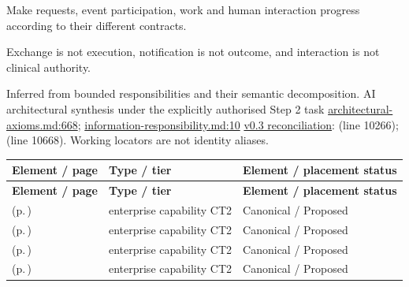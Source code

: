 
Make requests, event participation, work and human interaction progress according to their different contracts.



Exchange is not execution, notification is not outcome, and interaction is not clinical authority.


Inferred from bounded responsibilities and their semantic decomposition. AI architectural synthesis under the explicitly authorised Step 2 task \hyperref[evidence:27549d51551beae6]{architectural-axioms.md:668}; \hyperref[evidence:be61392fefb4bb10]{information-responsibility.md:10}
\hyperref[model:reconciliation]{v0.3 reconciliation}: \texttt{} (line 10266); \texttt{} (line 10668). Working locators are not identity aliases.
\begingroup\small\setlength{\TableWidth}{\dimexpr\linewidth-6\tabcolsep-4\arrayrulewidth\relax}
\begin{longtable}{|>{\raggedright\arraybackslash}p{0.52\TableWidth}|>{\raggedright\arraybackslash}p{0.2\TableWidth}|>{\raggedright\arraybackslash}p{0.28\TableWidth}|}
\hline\rowcolor{TableHead}\textbf{Element / page} & \textbf{Type / tier} & \textbf{Element / placement status}\\\hline\endfirsthead
\hline\rowcolor{TableHead}\textbf{Element / page} & \textbf{Type / tier} & \textbf{Element / placement status}\\\hline\endhead
\hline\endfoot
\nameref{cap:ec-08} (p.\,\pageref{cap:ec-08}) & enterprise capability CT2 & Canonical / Proposed\\\hline
\nameref{cap:ec-09} (p.\,\pageref{cap:ec-09}) & enterprise capability CT2 & Canonical / Proposed\\\hline
\nameref{cap:ec-10} (p.\,\pageref{cap:ec-10}) & enterprise capability CT2 & Canonical / Proposed\\\hline
\nameref{cap:ec-11} (p.\,\pageref{cap:ec-11}) & enterprise capability CT2 & Canonical / Proposed\\\hline
\end{longtable}\endgroup

